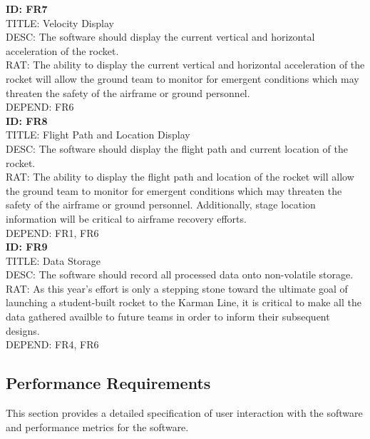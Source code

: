 \documentclass[onecolumn, draftclsnofoot,10pt, compsoc]{IEEEtran}
\begin{document}
			\noindent
			\textbf{ID: FR7}\\
			TITLE: Velocity Display\\
			DESC: The software should display the current vertical and horizontal acceleration of the rocket.\\
			RAT: The ability to display the current vertical and horizontal acceleration of the rocket will allow the ground team to monitor for emergent conditions which may threaten the safety of the airframe or ground personnel.\\
			DEPEND: FR6\\
			
			\noindent
			\textbf{ID: FR8}\\
			TITLE: Flight Path and Location Display\\
			DESC: The software should display the flight path and current location of the rocket.\\
			RAT: The ability to display the flight path and location of the rocket will allow the ground team to monitor for emergent conditions which may threaten the safety of the airframe or ground personnel.
				Additionally, stage location information will be critical to airframe recovery efforts.\\
			DEPEND: FR1, FR6\\
			
			\noindent
			\textbf{ID: FR9}\\
			TITLE: Data Storage\\
			DESC: The software should record all processed data onto non-volatile storage.\\
			RAT: As this year's effort is only a stepping stone toward the ultimate goal of launching a student-built rocket to the Karman Line, it is critical to make all the data gathered availble to future teams in order to inform their subsequent designs.\\
			DEPEND: FR4, FR6\\
		
		\subsection{Performance Requirements}
			This section provides a detailed specification of user interaction with the software and performance metrics for the software.
		
\end{document}
